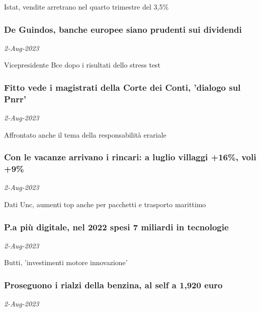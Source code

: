 Istat, vendite arretrano nel quarto trimestre del 3,5\%
\subsubsection{De Guindos, banche europee siano prudenti sui dividendi \href{https://www.ansa.it/sito/notizie/economia/2023/08/02/de-guindos-banche-europee-siano-prudenti-sui-dividendi_0bd4f900-8873-4c7d-a98a-1804a2ed3808.html}{}}
\textit{2-Aug-2023}

Vicepresidente Bce dopo i risultati dello stress test
\subsubsection{Fitto vede i magistrati della Corte dei Conti, 'dialogo sul Pnrr' \href{https://www.ansa.it/sito/notizie/economia/2023/08/02/fitto-vede-magistrati-c.conti-dialogo-su-attuazione-pnrr_2a448003-268f-49e3-b0c1-3aa27e09c3ee.html}{}}
\textit{2-Aug-2023}

Affrontato anche il tema della responsabilit\`{a} erariale
\subsubsection{Con le vacanze arrivano i rincari: a luglio villaggi +16\%, voli +9\% \href{https://www.ansa.it/sito/notizie/economia/2023/08/02/e-caro-vacanze-a-luglio-villaggi-16-voli-9_454b4796-aef2-448b-89c4-af4cd561ca3e.html}{}}
\textit{2-Aug-2023}

Dati Unc, aumenti top anche per pacchetti e trasporto marittimo
\subsubsection{P.a pi\`{u} digitale, nel 2022 spesi 7 miliardi in tecnologie \href{https://www.ansa.it/sito/notizie/economia/2023/08/02/p.a-piu-digitale-nel-2022-spesi-7-miliardi-in-tecnologie_95ce8251-8cb5-49a1-b8ad-1ab5ae881847.html}{}}
\textit{2-Aug-2023}

Butti, 'investimenti motore innovazione'
\subsubsection{Proseguono i rialzi della benzina, al self a 1,920 euro \href{https://www.ansa.it/sito/notizie/economia/2023/08/02/proseguono-i-rialzi-della-benzina-al-self-a-1920-euro_32e774ce-2b9c-4d06-b3fd-9b6e27b47c9d.html}{}}
\textit{2-Aug-2023}

